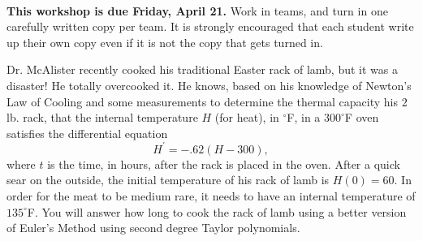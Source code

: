 \documentclass[letterpaper,11pt]{examPTP}
\begin{document}
\pagestyle{headandfoot}


\noindent \underline{\hspace{6.5in}}


\begin{center}
\addpoints
\gradetable[h]  
\end{center}
\workshopinstructions
\\
{\bf This workshop is due Friday, April 21.} Work in teams, and turn in one carefully written copy per team. It is strongly encouraged that each student write up their own copy even if it is not the copy that gets turned in.
\par 

\begin{questions}
\question Dr. McAlister recently cooked his traditional Easter rack of lamb, but it was a disaster! He totally overcooked it. He knows, based on his knowledge of Newton's Law of Cooling and some measurements to determine the thermal capacity his $2$ lb. rack, that the internal temperature $H$ (for heat), in $^{\circ}$F, in a $300^{\circ}$F oven satisfies the differential equation
\[
H^{\prime} = -.62(H-300),
\]
where $t$ is the time, in hours, after the rack is placed in the oven. After a quick sear on the outside, the initial temperature of his rack of lamb is $H(0) = 60$. In order for the meat to be medium rare, it needs to have an internal temperature of $135^{\circ}$F. You will answer how long to cook the rack of lamb using a better version of Euler's Method using second degree Taylor polynomials.
\end{questions}
\end{document}
